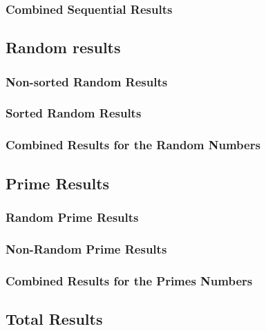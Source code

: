 \subsubsection{Combined Sequential Results}
\label{combined_sequential}


\subsection{Random results}
\label{random_results}
\subsubsection{Non-sorted Random Results}
\label{non-sorted_random_results}


\subsubsection{Sorted Random Results}
\subsubsection{Combined Results for the Random Numbers}



\subsection{Prime Results}
\label{prime_results}
\subsubsection{Random Prime Results}
\label{random_prime_results}


\subsubsection{Non-Random Prime Results}
\label{non-random_prime_results}



\subsubsection{Combined Results for the Primes Numbers} 
\label{combined_prime}



\subsection{Total Results}
